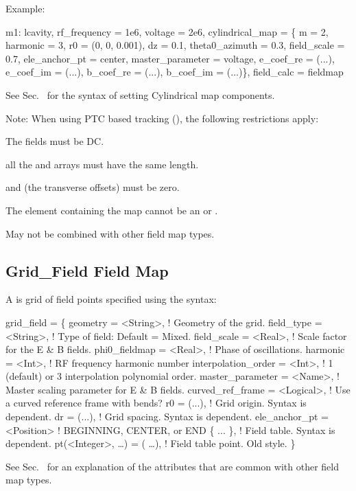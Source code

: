 Example:
\begin{example}
  m1: lcavity, rf_frequency = 1e6, voltage = 2e6, cylindrical_map = \{
    m = 2,                   harmonic = 3,
    r0 = (0, 0, 0.001),      dz = 0.1,
    theta0_azimuth = 0.3,    field_scale = 0.7,
    ele_anchor_pt = center,  master_parameter = voltage,
    e_coef_re = (...),       e_coef_im = (...),
    b_coef_re = (...),       b_coef_im = (...)\}, field_calc = fieldmap
\end{example}

See Sec.~ for the syntax of setting Cylindrical map components.

Note: When using PTC based tracking (), the following restrictions apply:
\begin{Itemize}
%
\item
The fields must be DC.
%
\item
all the  and  arrays must have the same length.
%
\item
{} and  (the transverse offsets) must be zero.
%
\item
The element containing the map cannot be an  or .
%
\item
May not be combined with other field map types.
\end{Itemize}

\subsection{Grid_Field Field Map}
\label{s:grid.field}

A  is grid of field points specified using the syntax:
\begin{example}
  grid_field = \{ 
    geometry         = <String>,    ! Geometry of the grid.
    field_type       = <String>,    ! Type of field: Default = Mixed.
    field_scale      = <Real>,      ! Scale factor for the E & B fields.
    phi0_fieldmap    = <Real>,      ! Phase of oscillations.
    harmonic         = <Int>,       ! RF frequency harmonic number 
    interpolation_order = <Int>,    ! 1 (default) or 3 interpolation polynomial order.
    master_parameter = <Name>,      ! Master scaling parameter for E & B fields.
    curved_ref_frame = <Logical>,   ! Use a curved reference frame with bends?
    r0   = (...),                   ! Grid origin. Syntax is  dependent.
    dr   = (...),                   ! Grid spacing. Syntax is  dependent.
    ele_anchor_pt = <Position>      ! BEGINNING, CENTER, or END
    \{ ... \},                      ! Field table. Syntax is  dependent.
    pt(<Integer>, \dots) = ( \ldots ), ! Field table point. Old style.
  \}
\end{example}
See Sec.~ for an explanation of the attributes that are common with
other field map types.

